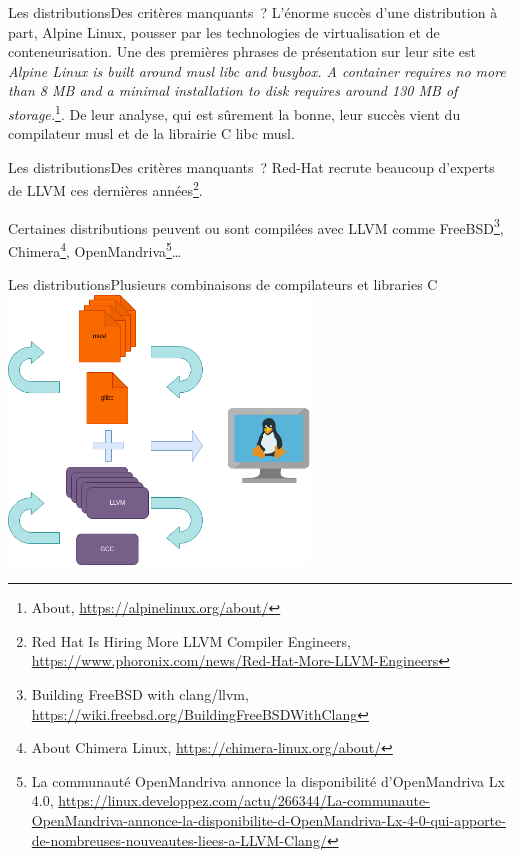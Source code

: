 \documentclass{beamer}
\begin{document}
    \begin{frame}{Les distributions}{Des critères manquants~?}
        L'énorme succès d'une distribution à part, Alpine Linux, pousser par les technologies de virtualisation et de conteneurisation.
        \bigbreak
        Une des premières phrases de présentation sur leur site est \textit{Alpine Linux is built around musl libc and busybox. A container requires no more than 8 MB and a minimal installation to disk requires around 130 MB of storage.}\footnote{About, \url{https://alpinelinux.org/about/}}.
        \bigbreak
        De leur analyse, qui est sûrement la bonne, leur succès vient du compilateur musl et de la librairie C libc musl.
    \end{frame}

    \begin{frame}{Les distributions}{Des critères manquants~?}
        Red-Hat recrute beaucoup d'experts de LLVM ces dernières années\footnote{Red Hat Is Hiring More LLVM Compiler Engineers, \url{https://www.phoronix.com/news/Red-Hat-More-LLVM-Engineers}}.

        Certaines distributions peuvent ou sont compilées avec LLVM comme FreeBSD\footnote{Building FreeBSD with clang/llvm, \url{https://wiki.freebsd.org/BuildingFreeBSDWithClang}}, Chimera\footnote{About Chimera Linux, \url{https://chimera-linux.org/about/}}, OpenMandriva\footnote{La communauté OpenMandriva annonce la disponibilité d'OpenMandriva Lx 4.0, \url{https://linux.developpez.com/actu/266344/La-communaute-OpenMandriva-annonce-la-disponibilite-d-OpenMandriva-Lx-4-0-qui-apporte-de-nombreuses-nouveautes-liees-a-LLVM-Clang/}}\ldots
    \end{frame}

    \begin{frame}{Les distributions}{Plusieurs combinaisons de compilateurs et libraries C}
        \centering
        \includegraphics[width=8cm]{image/interchange-lib-compiler.drawio}
    \end{frame}
\end{document}
